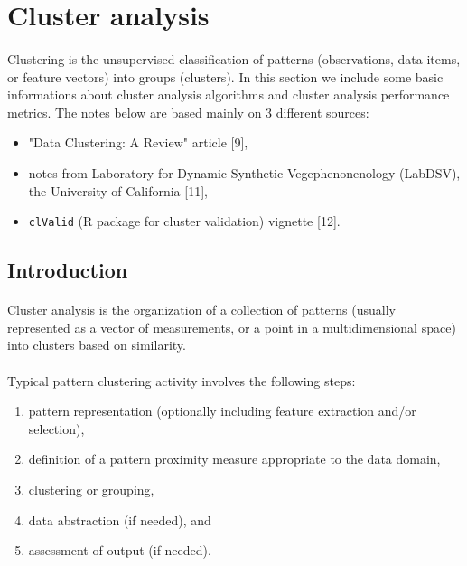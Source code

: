 \documentclass[10pt]{article}\usepackage[]{graphicx}\usepackage[]{color}
\begin{document}
\clearpage
\section{Cluster analysis}
\paragraph{}
Clustering is the unsupervised classification of patterns (observations, data 
items, or feature vectors) into groups (clusters). In this section we include some
basic informations about cluster analysis algorithms and cluster analysis 
performance metrics. The notes below are based mainly on 3 different sources: 
\begin{itemize}
\item "Data Clustering: A Review" article [9],
\item notes from Laboratory for Dynamic Synthetic Vegephenonenology (LabDSV),
the University of California [11],
\item \texttt{clValid} (R package for cluster validation) vignette [12].
\end{itemize}

\subsection{Introduction}
\paragraph{}
Cluster analysis is the organization of a collection of patterns (usually
represented as a vector of measurements, or a point in a multidimensional
space) into clusters based on similarity. 
\paragraph{}
Typical pattern clustering activity involves the following steps:
\begin{enumerate}
\item pattern representation (optionally including feature extraction and/or
selection),
\item definition of a pattern proximity measure appropriate to the data domain,
\item clustering or grouping,
\item data abstraction (if needed), and
\item assessment of output (if needed).
\end{enumerate}
\end{document}
